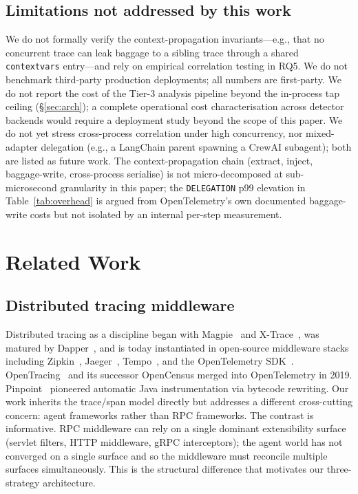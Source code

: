 \documentclass[sigconf,review,anonymous,9pt]{acmart}
\begin{document}
\subsection{Limitations not addressed by this work}

We do not formally verify the context-propagation invariants---e.g.,
that no concurrent trace can leak baggage to a sibling trace through
a shared \texttt{contextvars} entry---and rely on empirical
correlation testing in RQ5. We do not benchmark third-party
production deployments; all numbers are first-party. We do not
report the cost of the Tier-3 analysis pipeline beyond the
in-process tap ceiling (\S\ref{sec:arch}); a complete operational
cost characterisation across detector backends would require a
deployment study beyond the scope of this paper. We do not yet
stress cross-process correlation under high concurrency, nor
mixed-adapter delegation (e.g., a LangChain parent spawning a
CrewAI subagent); both are listed as future work. The
context-propagation chain (extract, inject, baggage-write,
cross-process serialise) is not micro-decomposed at sub-microsecond
granularity in this paper; the
\texttt{DELEGATION} p99 elevation in Table~\ref{tab:overhead} is
argued from OpenTelemetry's own documented baggage-write costs but
not isolated by an internal per-step measurement.

\section{Related Work}
\label{sec:related}

\subsection{Distributed tracing middleware}
Distributed tracing as a discipline began with Magpie~\cite{magpie}
and X-Trace~\cite{xtrace}, was matured by Dapper~\cite{dapper}, and
is today instantiated in open-source middleware stacks including
Zipkin~\cite{zipkin}, Jaeger~\cite{jaeger}, Tempo~\cite{tempo}, and
the OpenTelemetry SDK~\cite{otel}. OpenTracing~\cite{opentracing}
and its successor OpenCensus merged into OpenTelemetry in 2019.
Pinpoint~\cite{pinpoint} pioneered automatic Java instrumentation
via bytecode rewriting. Our work inherits the trace/span model
directly but addresses a different cross-cutting concern: agent
frameworks rather than RPC frameworks. The contrast is informative.
RPC middleware can rely on a single dominant extensibility surface
(servlet filters, HTTP middleware, gRPC interceptors); the agent
world has not converged on a single surface and so the middleware
must reconcile multiple surfaces simultaneously. This is the
structural difference that motivates our three-strategy architecture.
\end{document}
